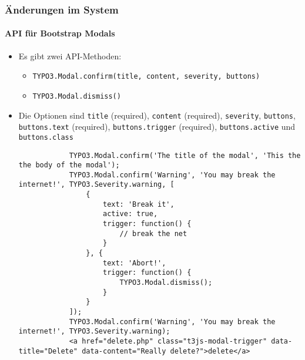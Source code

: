 \begin{frame}[fragile]
	\frametitle{Änderungen im System}
	\framesubtitle{API für Bootstrap Modals}

	\begin{itemize}
		\item Es gibt zwei API-Methoden:
		\begin{itemize}
			\item \texttt{TYPO3.Modal.confirm(title, content, severity, buttons)}
			\item \texttt{TYPO3.Modal.dismiss()}		
		\end{itemize}
		\item Die Optionen sind \texttt{title} (required), \texttt{content} (required), \texttt{severity}, \texttt{buttons}, \texttt{buttons.text} (required), \texttt{buttons.trigger} (required), \texttt{buttons.active} und \texttt{buttons.class} 

		\begin{lstlisting}
			TYPO3.Modal.confirm('The title of the modal', 'This the the body of the modal');
			TYPO3.Modal.confirm('Warning', 'You may break the internet!', TYPO3.Severity.warning, [
				{
					text: 'Break it',
					active: true,
					trigger: function() {
						// break the net
					}
				}, {
					text: 'Abort!',
					trigger: function() {
						TYPO3.Modal.dismiss();
					}
				}
			]);
			TYPO3.Modal.confirm('Warning', 'You may break the internet!', TYPO3.Severity.warning);
			<a href="delete.php" class="t3js-modal-trigger" data-title="Delete" data-content="Really delete?">delete</a>
		\end{lstlisting}

	\end{itemize}

\end{frame}


